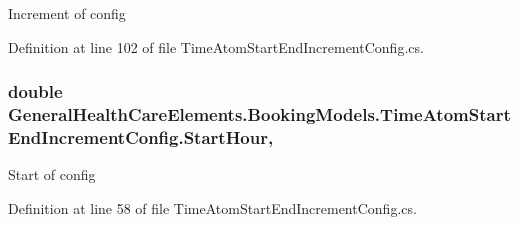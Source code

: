 Increment of config 



Definition at line 102 of file Time\+Atom\+Start\+End\+Increment\+Config.\+cs.

\subsubsection[{\texorpdfstring{Start\+Hour}{StartHour}}]{\setlength{\rightskip}{0pt plus 5cm}double General\+Health\+Care\+Elements.\+Booking\+Models.\+Time\+Atom\+Start\+End\+Increment\+Config.\+Start\+Hour\hspace{0.3cm}{\ttfamily [get]}, {\ttfamily [set]}}\hypertarget{class_general_health_care_elements_1_1_booking_models_1_1_time_atom_start_end_increment_config_a01fd2d9ff3be8aba83d87474d3a075a2}{}\label{class_general_health_care_elements_1_1_booking_models_1_1_time_atom_start_end_increment_config_a01fd2d9ff3be8aba83d87474d3a075a2}


Start of config 



Definition at line 58 of file Time\+Atom\+Start\+End\+Increment\+Config.\+cs.

